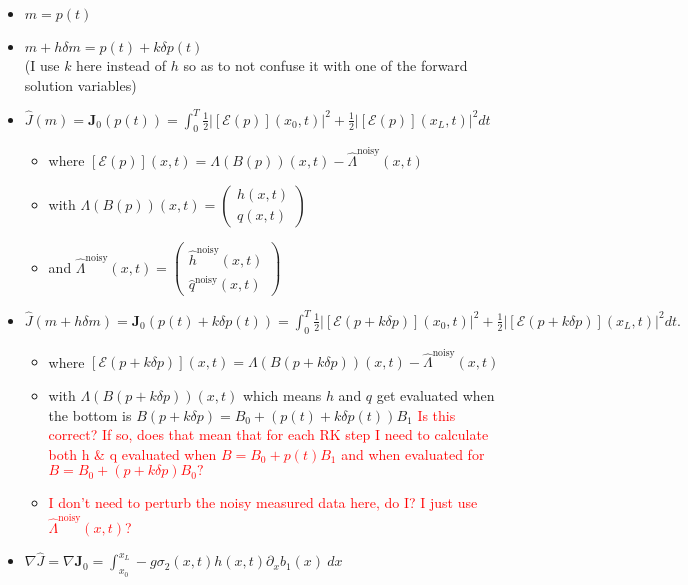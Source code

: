 \documentclass{article}
\begin{document}
\begin{itemize}
    \item $m = p(t)$
    \item $m + h \delta m = p(t) + k \delta p(t)$ 
    \\ (I use $k$ here instead of $h$ so as to not confuse it with one of the forward solution variables)
    \item $\hat{J}(m) 
    = \bm{J}_0(p(t)) 
    = \int_0^T \frac{1}{2}\left|\left[\mathcal{E}(p)\right](x_0,t)\right|^2 + \frac{1}{2}\left|\left[\mathcal{E}(p)\right](x_L,t)\right|^2 dt $ 
    \begin{itemize}[label=$\circ$]
        \item where $\left[\mathcal{E}(p)\right](x,t) = \Lambda(B(p)) (x,t)-\hat{\Lambda}^{\text{noisy}}(x,t)$ 
        \item with $\Lambda(B(p)) (x,t) = \begin{pmatrix} h(x,t) \\ q(x,t) \end{pmatrix}$
        \item and $\hat{\Lambda}^{\text{noisy}}(x,t) = \begin{pmatrix} \hat{h}^{\text{noisy}}(x,t) \\ \hat{q}^{\text{noisy}}(x,t) \end{pmatrix}$
    \end{itemize}
    \item $\hat{J}(m + h \delta m) 
    = \bm{J}_0(p(t) + k \delta p(t)) 
    = \int_0^T \frac{1}{2}\left|\left[\mathcal{E}(p+k\delta p)\right](x_0,t)\right|^2 + \frac{1}{2}\left|\left[\mathcal{E}(p+k\delta p)\right](x_L,t)\right|^2 dt .$
    \begin{itemize}[label=$\circ$]
        \item where $\left[\mathcal{E}(p+k\delta p)\right](x,t) = \Lambda(B(p+k\delta p)) (x,t)-\hat{\Lambda}^{\text{noisy}}(x,t)$ 
        \item with $\Lambda(B(p+k\delta p)) (x,t)$ which means $h$ and $q$ get evaluated when the bottom is $B(p+k\delta p) = B_0 + (p(t) + k \delta p(t))B_1$
        \textcolor{red}{Is this correct? If so, does that mean that for each RK step I need to calculate both h \& q evaluated when $B = B_0 + p(t)B_1$ and when evaluated for $B = B_0 + (p + k \delta p)B_0?$}
        \item  \textcolor{red}{I don't need to perturb the noisy measured data here, do I? I just use $\hat{\Lambda}^{\text{noisy}}(x,t)$?}
    \end{itemize}
    \item $\nabla \hat{J} 
    = \nabla \bm{J}_0 
    = \int_{x_0}^{x_L} -g \sigma_2(x,t) h(x,t) \partial_x b_1(x) \ dx$
\end{itemize}
\end{document}
